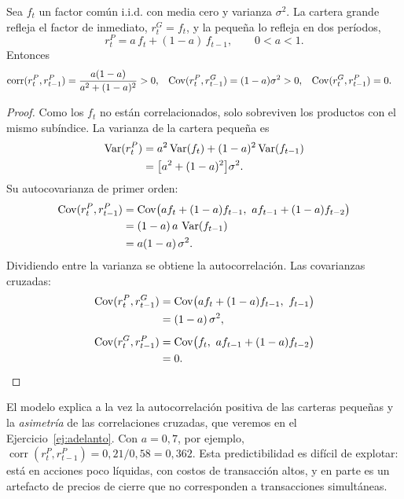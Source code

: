 \begin{proposicion}\label{prop:ajusteparcial}
Sea $f_t$ un factor común i.i.d. con media cero y varianza $\sigma^2$. La cartera grande refleja el factor de
inmediato, $r^G_t=f_t$, y la pequeña lo refleja en dos períodos,
\[
  r^P_t=a\,f_t+(1-a)\,f_{t-1},\qquad 0<a<1 .
\]
Entonces
\begin{align*}
  \operatorname{corr}(r^P_t,r^P_{t-1})&=\frac{a(1-a)}{a^2+(1-a)^2}>0, &
  \operatorname{Cov}(r^P_t,r^G_{t-1})&=(1-a)\sigma^2>0, &
  \operatorname{Cov}(r^G_t,r^P_{t-1})&=0 .
\end{align*}
\end{proposicion}

\begin{proof}
Como los $f_t$ no están correlacionados, solo sobreviven los productos con el mismo subíndice. La varianza de
la cartera pequeña es
\begin{align*}
  \operatorname{Var}(r^P_t) &= a^2\operatorname{Var}(f_t)+(1-a)^2\operatorname{Var}(f_{t-1})\\
              &= \bigl[a^2+(1-a)^2\bigr]\sigma^2 .
\end{align*}
Su autocovarianza de primer orden:
\begin{align*}
  \operatorname{Cov}(r^P_t,r^P_{t-1}) &= \operatorname{Cov}\bigl(a f_t+(1-a)f_{t-1},\ a f_{t-1}+(1-a)f_{t-2}\bigr)\\
                        &= (1-a)\,a\,\operatorname{Var}(f_{t-1})\\
                        &= a(1-a)\,\sigma^2 .
\end{align*}
Dividiendo entre la varianza se obtiene la autocorrelación. Las covarianzas cruzadas:
\begin{align*}
  \Cov(r^P_t,r^G_{t-1}) &= \Cov\bigl(a f_t+(1-a)f_{t-1},\ f_{t-1}\bigr)\\
                        &= (1-a)\,\sigma^2,\\[4pt]
  \Cov(r^G_t,r^P_{t-1}) &= \Cov\bigl(f_t,\ a f_{t-1}+(1-a)f_{t-2}\bigr)\\
                        &= 0 . \qedhere
\end{align*}
\end{proof}

El modelo explica a la vez la autocorrelación positiva de las carteras pequeñas y la \emph{asimetría} de las
correlaciones cruzadas, que veremos en el Ejercicio~\ref{ej:adelanto}. Con $a=0{,}7$, por ejemplo,
$\operatorname{corr}(r^P_t,r^P_{t-1})=0{,}21/0{,}58=0{,}362$. Esta predictibilidad es difícil de explotar: está
en acciones poco líquidas, con costos de transacción altos, y en parte es un artefacto de precios de cierre que
no corresponden a transacciones simultáneas.

